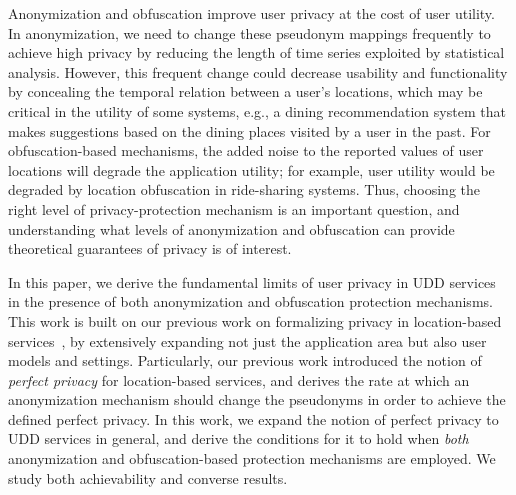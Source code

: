 Anonymization and obfuscation improve user privacy at the cost of user utility.  In anonymization, we need to change these pseudonym mappings frequently to achieve high privacy by reducing the length of time series exploited by statistical analysis.  However, this frequent change could decrease usability and functionality by concealing the temporal relation between a user's locations, which may be critical in the utility of some systems, e.g., a dining recommendation system that makes suggestions based on the dining places visited by a user in the past.  For obfuscation-based mechanisms, the added noise to the reported values of user locations will degrade the application utility; for example, user utility would be degraded by location obfuscation in ride-sharing systems.  Thus, choosing the right level of privacy-protection mechanism is an important question, and understanding what levels of anonymization and obfuscation can provide theoretical guarantees of privacy is of interest.

In this paper, we derive the fundamental limits of user privacy in UDD services in the presence of both anonymization and obfuscation protection mechanisms. This work is built on our previous work on formalizing privacy in location-based services~\cite{montazeri2016defining, Mont1610Achieving,tifs2016, ciss2017}, by extensively expanding not just the application area but also user models and settings. 
Particularly, our previous work introduced the notion of 
\emph{perfect privacy} for location-based services, and derives the rate at which an anonymization mechanism should change the pseudonyms in order to 
achieve the defined perfect privacy. 
In this work, we expand the notion of perfect privacy to UDD services in general, and derive the conditions for it to hold when \emph{both}
anonymization and obfuscation-based protection mechanisms are employed.   
 We study both achievability and converse results.  


